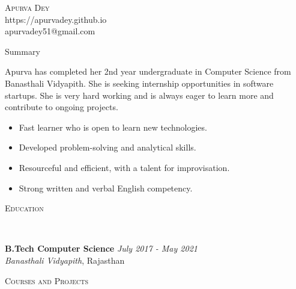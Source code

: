 \documentclass[9pt]{article}
\newenvironment{changemargin}[2]{%
  \begin{list}{}{%
    \setlength{\topsep}{0pt}%
    \setlength{\leftmargin}{#1}%
    \setlength{\rightmargin}{#2}%
    \setlength{\listparindent}{\parindent}%
    \setlength{\itemindent}{\parindent}%
    \setlength{\parsep}{\parskip}%
  }%
  \item[]}{\end{list}
}
\newcommand{\lineover}{
    \begin{changemargin}{-0.05in}{-0.05in}
        \vspace*{-8pt}
        \hrulefill \\
        \vspace*{-2pt}
    \end{changemargin}
}
\newcommand{\header}[1]{
    \begin{changemargin}{-0.5in}{-0.5in}
        \scshape{#1}\\
    \lineover
    \end{changemargin}
}
\newcommand{\contact}[4]{
    \begin{changemargin}{-0.5in}{-0.5in}
        \begin{center}
            {\Large \scshape {#1}}\\ \smallskip
            {#2}\\ \smallskip
            {#3}\\ \smallskip
            {#4}\smallskip
        \end{center}
    \end{changemargin}
}
\newenvironment{body} {
    \vspace*{-16pt}
    \begin{changemargin}{-0.25in}{-0.5in}
  }
    {\end{changemargin}
}
\begin{document}
\contact{Apurva Dey}{https://apurvadey.github.io}{apurvadey51@gmail.com}


\header{Summary}

\begin{body}
    \vspace{14pt}
Apurva has completed her 2nd year undergraduate in Computer Science from Banasthali Vidyapith. She is seeking internship opportunities in software startups. She is very hard working and is always eager to learn more and contribute to ongoing projects.


\begin{itemize} \itemsep -0pt
    \item Fast learner who is open to learn new technologies.
    \item Developed problem-solving and analytical skills.
    \item Resourceful and efficient, with a talent for improvisation.
    \item Strong written and verbal English competency.
\end{itemize}

\end{body}

\smallskip


\header{Education}

\begin{body}
    \vspace{14pt}
    \textbf{B.Tech Computer Science }{} \hfill \emph{July 2017 - May 2021}{} \\
    \emph{Banasthali Vidyapith}, Rajasthan{} \\
\end{body}

\smallskip


\header{Courses and Projects}
\end{document}
